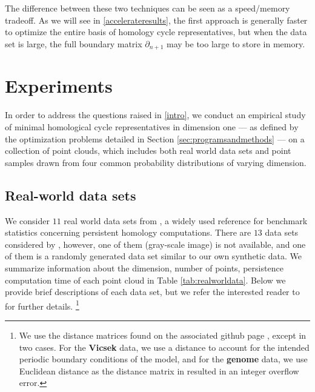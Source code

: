 The difference between these two techniques can be seen as a speed/memory tradeoff.  As we will see in \se \ref{accelerateresults}, the first approach is generally faster to optimize the entire basis of homology cycle representatives, but when the data set is large, the full boundary matrix $\partial_{n+1}$ may be too large to store in memory. 


\section{Experiments}\label{methods}


In order to address the questions raised in \se \ref{intro}, we conduct an empirical study of minimal homological cycle representatives in dimension one --- as defined by the optimization problems detailed in Section \ref{sec:programsandmethods} --- on a collection of point clouds, which includes both real world data sets and point samples drawn from four common probability distributions of varying dimension.  
\newcommand{\sample}{\mathbf{S}}


\subsection{Real-world data sets} \label{sec: realworlddata}
We consider $11$ real world data sets from \cite{roadmap2017}, a widely used reference for benchmark statistics concerning persistent homology computations. There are $13$ data sets considered by \cite{roadmap2017}, however, one of them (gray-scale image) is not available, and one of them is a randomly generated data set 
similar to our own synthetic data. We summarize information about the dimension, number of points, persistence computation time of each point cloud in Table \ref{tab:realworldata}. Below we provide brief descriptions of each data set, but we refer the interested reader to \cite{roadmap2017} for further details. \footnote{We use the distance matrices found on the associated github page \cite{roadmapgithub}, except in two cases. For the \textbf{Vicsek} data, we use a distance to account for the intended periodic boundary conditions of the model, and for the \textbf{genome} data, we use Euclidean distance as the distance matrix in \cite{roadmapgithub} resulted in an integer overflow error.}


